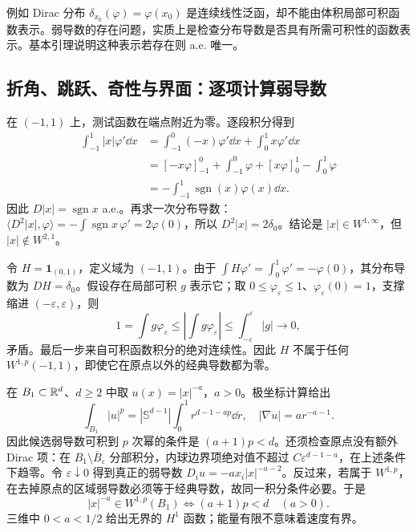 例如 Dirac 分布 $\delta_{x_0}(\varphi)=\varphi(x_0)$ 是连续线性泛函，却不能由体积局部可积函数表示。弱导数的存在问题，实质上是检查分布导数是否具有所需可积性的函数表示。基本引理说明这种表示若存在则 a.e. 唯一。

\subsection{折角、跳跃、奇性与界面：逐项计算弱导数}

\begin{example}[折角：$u(x)=|x|$]
在 $(-1,1)$ 上，测试函数在端点附近为零。逐段积分得到
\begin{align*}
 \int_{-1}^1|x|\varphi'\dd x
 &=\int_{-1}^0(-x)\varphi'\dd x+\int_0^1x\varphi'\dd x\\
 &=[-x\varphi]_{-1}^0+\int_{-1}^0\varphi
   +[x\varphi]_0^1-\int_0^1\varphi\\
 &=-\int_{-1}^1\operatorname{sgn}(x)\varphi(x)\dd x.
\end{align*}
因此 $D|x|=\operatorname{sgn}x$ a.e.。再求一次分布导数：
$\langle D^2|x|,\varphi\rangle=-\int\operatorname{sgn}x\,\varphi'=2\varphi(0)$，所以 $D^2|x|=2\delta_0$。结论是 $|x|\in W^{1,\infty}$，但 $|x|\notin W^{2,1}$。
\end{example}

\begin{example}[跳跃：阶跃函数]
令 $H=\mathbf1_{(0,1)}$，定义域为 $(-1,1)$。由于 $\int H\varphi'=\int_0^1\varphi'=-\varphi(0)$，其分布导数为 $DH=\delta_0$。假设存在局部可积 $g$ 表示它；取 $0\le\varphi_\varepsilon\le1$、$\varphi_\varepsilon(0)=1$，支撑缩进 $(-\varepsilon,\varepsilon)$，则
\[
 1=\int g\varphi_\varepsilon
 \le\left|\int g\varphi_\varepsilon\right|
 \le\int_{-\varepsilon}^{\varepsilon}|g|\longrightarrow0,
\]
矛盾。最后一步来自可积函数积分的绝对连续性。因此 $H$ 不属于任何 $W^{1,p}(-1,1)$，即使它在原点以外的经典导数都为零。
\end{example}

\begin{example}
在 $B_1\subset\mathbb R^d$、$d\ge2$ 中取 $u(x)=|x|^{-a}$，$a>0$。极坐标计算给出
\[
 \int_{B_1}|u|^p=|\mathbb S^{d-1}|\int_0^1r^{d-1-ap}\dd r,
 \quad |\nabla u|=a r^{-a-1}.
\]
因此候选弱导数可积到 $p$ 次幂的条件是 $(a+1)p<d$。还须检查原点没有额外 Dirac 项：在 $B_1\setminus\overline B_\varepsilon$ 分部积分，内球边界项绝对值不超过 $C\varepsilon^{d-1-a}$，在上述条件下趋零。令 $\varepsilon\downarrow0$ 得到真正的弱导数 $D_i u=-a x_i|x|^{-a-2}$。反过来，若属于 $W^{1,p}$，在去掉原点的区域弱导数必须等于经典导数，故同一积分条件必要。于是
\[
 |x|^{-a}\in W^{1,p}(B_1)\iff (a+1)p<d\quad(a>0).
\]
三维中 $0<a<1/2$ 给出无界的 $H^1$ 函数；能量有限不意味着速度有界。
\end{example}


